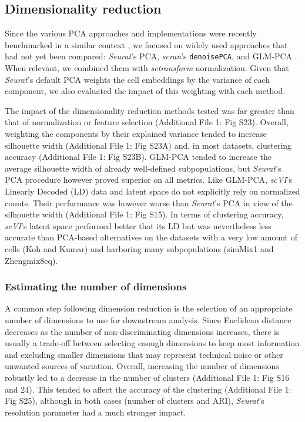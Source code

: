 \documentclass{bmcart}
\begin{document}
\subsection*{Dimensionality reduction}

Since the various PCA approaches and implementations were recently benchmarked in a similar context \cite{TsuyuzakiPCA2020}, we focused on widely used approaches that had not yet been compared: \textit{Seurat}'s PCA, \textit{scran}'s \texttt{denoisePCA}, and GLM-PCA \cite{townesGlmpca2019}. When relevant, we combined them with \textit{sctransform} normalization. Given that \textit{Seurat}'s default PCA weights the cell embeddings by the variance of each component, we also evaluated the impact of this weighting with each method.

The impact of the dimensionality reduction methods tested was far greater than that of normalization or feature selection (Additional File 1: Fig S23). Overall, weighting the components by their explained variance tended to increase silhouette width (Additional File 1: Fig S23A) and, in most datasets, clustering accuracy (Additional File 1: Fig S23B). GLM-PCA tended to increase the average silhouette width of already well-defined subpopulations, but \textit{Seurat}'s PCA procedure however proved superior on all metrics. Like GLM-PCA, \textit{scVI}'s Linearly Decoded (LD) data \cite{SvenssonLDVAE2020} and latent space do not explicitly rely on normalized counts. Their performance was however worse than \textit{Seurat}'s PCA in view of the silhouette width (Additional File 1: Fig S15). In terms of clustering accuracy, \textit{scVI}'s latent space performed better that its LD but was nevertheless less accurate than PCA-based alternatives on the datasets with a very low amount of cells (Koh and Kumar) and harboring many subpopulations (simMix1 and Zhengmix8eq).

\subsubsection*{Estimating the number of dimensions}

A common step following dimension reduction is the selection of an appropriate number of dimensions to use for downstream analysis. Since Euclidean distance decreases as the number of non-discriminating dimensions increases, there is usually a trade-off between selecting enough dimensions to keep most information and excluding smaller dimensions that may represent technical noise or other unwanted sources of variation. Overall, increasing the number of dimensions robustly led to a decrease in the number of clusters (Additional File 1: Fig S16 and 24). This tended to affect the accuracy of the clustering (Additional File 1: Fig S25), although in both cases (number of clusters and ARI), \textit{Seurat}'s resolution parameter had a much stronger impact.
\end{document}
